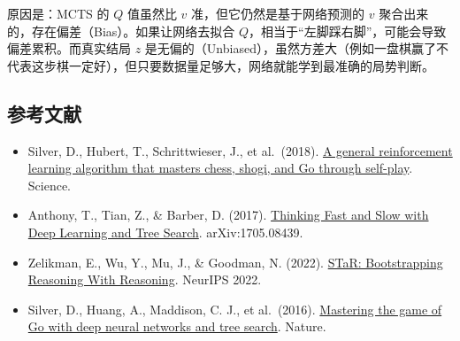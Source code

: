 原因是：MCTS 的 \(Q\) 值虽然比 \(v\) 准，但它仍然是基于网络预测的 \(v\) 聚合出来的，存在偏差（Bias）。如果让网络去拟合 \(Q\)，相当于``左脚踩右脚''，可能会导致偏差累积。而真实结局 \(z\) 是无偏的（Unbiased），虽然方差大（例如一盘棋赢了不代表这步棋一定好），但只要数据量足够大，网络就能学到最准确的局势判断。

\FloatBarrier
{}
\hypertarget{ux53c2ux8003ux6587ux732e-81}{%
\subsection{参考文献}\label{ux53c2ux8003ux6587ux732e-81}}

\vspace{0.25em}
\begin{itemize}
\tightlist
\item
  Silver, D., Hubert, T., Schrittwieser, J., et al.~(2018). \href{https://www.science.org/doi/10.1126/science.aar6404}{A general reinforcement learning algorithm that masters chess, shogi, and Go through self-play}. Science.
\item
  Anthony, T., Tian, Z., \& Barber, D. (2017). \href{https://arxiv.org/abs/1705.08439}{Thinking Fast and Slow with Deep Learning and Tree Search}. arXiv:1705.08439.
\item
  Zelikman, E., Wu, Y., Mu, J., \& Goodman, N. (2022). \href{https://arxiv.org/abs/2203.14465}{STaR: Bootstrapping Reasoning With Reasoning}. NeurIPS 2022.
\item
  Silver, D., Huang, A., Maddison, C. J., et al.~(2016). \href{https://www.nature.com/articles/nature16961}{Mastering the game of Go with deep neural networks and tree search}. Nature.
\end{itemize}

\clearpage
